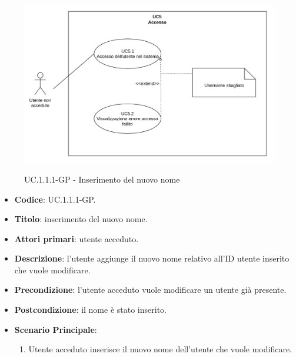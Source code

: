 				\begin{figure}[H]
					\centering
					\includegraphics[width=\columnwidth]{img/UC5.png}\\
					\caption{UC\theuccount.1.1.1-GP - Inserimento del nuovo nome}
				\end{figure}
				\begin{itemize}
					\item \textbf{Codice}: UC\theuccount.1.1.1-GP.
					\item \textbf{Titolo}: inserimento del nuovo nome.
					\item \textbf{Attori primari}: utente acceduto.
					\item \textbf{Descrizione}: l'utente aggiunge il nuovo nome relativo all'ID utente inserito che vuole modificare.
					\item \textbf{Precondizione}: l'utente acceduto vuole modificare un utente già presente.
					\item \textbf{Postcondizione}: il nome è stato inserito.
					\item \textbf{Scenario Principale}:
					\begin{enumerate}
						\item Utente acceduto inserisce il nuovo nome dell'utente che vuole modificare.
					\end{enumerate}
				\end{itemize}
			
